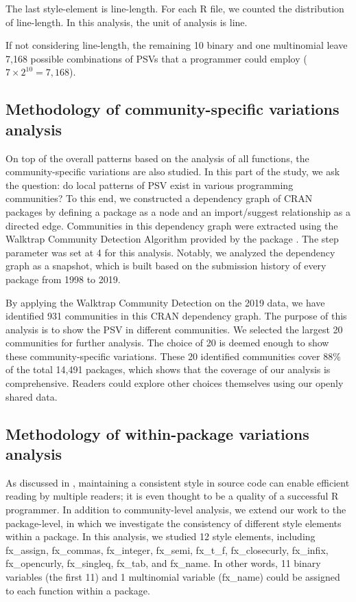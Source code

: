 The last style-element is line-length. For each R file, we counted the distribution of line-length. In this analysis, the unit of analysis is line.

If not considering line-length, the remaining 10 binary and one multinomial leave 7,168 possible combinations of PSVs that a programmer could employ ($7 \times 2^{10} = 7,168$).

\subsection{Methodology of community-specific variations analysis}

On top of the overall patterns based on the analysis of all functions, the community-specific variations are also studied. In this part of the study, we ask the question: do local patterns of PSV exist in various programming communities? To this end, we constructed a dependency graph of CRAN packages by defining a package as a node and an import/suggest relationship as a directed edge. Communities in this dependency graph were extracted using the Walktrap Community Detection Algorithm \citep{pons} provided by the  package \citep{csardi}. The step parameter was set at 4 for this analysis. Notably, we analyzed the dependency graph as a snapshot, which is built based on the submission history of every package from 1998 to 2019. 

By applying the Walktrap Community Detection on the 2019 data, we have identified 931 communities in this CRAN dependency graph. The purpose of this analysis is to show the PSV in different communities. We selected the largest 20 communities for further analysis. The choice of 20 is deemed enough to show these community-specific variations. These 20 identified communities cover 88\% of the total 14,491 packages, which shows that the coverage of our analysis is comprehensive. Readers could explore other choices themselves using our openly shared data.

\subsection{Methodology of within-package variations analysis}

As discussed in \citet{gillespie2016efficient}, maintaining a consistent style in source code can enable efficient reading by multiple readers; it is even thought to be a quality of a successful R programmer. In addition to community-level analysis, we extend our work to the package-level, in which we investigate the consistency of different style elements within a package. In this analysis, we studied 12 style elements, including fx\_assign, fx\_commas, fx\_integer, fx\_semi, fx\_t\_f, fx\_closecurly, fx\_infix, fx\_opencurly, fx\_singleq, fx\_tab, and fx\_name.  In other words, 11 binary variables (the first 11) and 1 multinomial variable (fx\_name) could be assigned to each function within a package.

